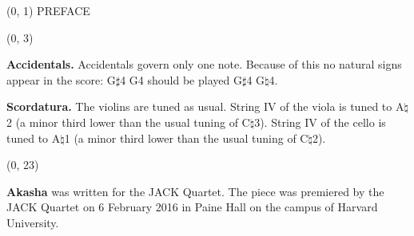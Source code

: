 \documentclass[10pt]{article}
\begin{document}
\begin{textblock}{23}(0, 1)
\center \huge PREFACE
\end{textblock}

\begin{textblock}{23}(0, 3)

\textbf{Accidentals.} Accidentals govern only one note. Because of this no
natural signs appear in the score: G$\sharp$4 G4 should be played G$\sharp$4
G$\natural$4.

\textbf{Scordatura.} The violins are tuned as usual. String IV of the viola is
tuned to A$\natural$2 (a minor third lower than the usual tuning of
C$\natural$3). String IV of the cello is tuned to A$\natural$1 (a minor third
lower than the usual tuning of C$\natural$2).

\end{textblock}

\begin{textblock}{23}(0, 23)

\textbf{Akasha} was written for the JACK Quartet. The piece was premiered by
the JACK Quartet on 6 February 2016 in Paine Hall on the campus of Harvard
University.

\end{textblock}
\end{document}
